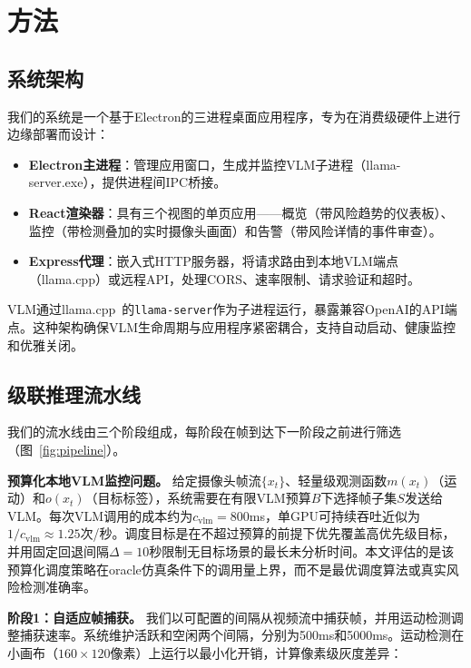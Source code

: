 \documentclass[a4paper,10pt]{ctexart}
\begin{document}
\section{方法}

\subsection{系统架构}

我们的系统是一个基于Electron的三进程桌面应用程序，专为在消费级硬件上进行边缘部署而设计：

\begin{itemize}
\item \textbf{Electron主进程}：管理应用窗口，生成并监控VLM子进程（llama-server.exe），提供进程间IPC桥接。
\item \textbf{React渲染器}：具有三个视图的单页应用——概览（带风险趋势的仪表板）、监控（带检测叠加的实时摄像头画面）和告警（带风险详情的事件审查）。
\item \textbf{Express代理}：嵌入式HTTP服务器，将请求路由到本地VLM端点（llama.cpp）或远程API，处理CORS、速率限制、请求验证和超时。
\end{itemize}

VLM通过llama.cpp~\cite{llamacpp}的\texttt{llama-server}作为子进程运行，暴露兼容OpenAI的API端点。这种架构确保VLM生命周期与应用程序紧密耦合，支持自动启动、健康监控和优雅关闭。

\subsection{级联推理流水线}

我们的流水线由三个阶段组成，每阶段在帧到达下一阶段之前进行筛选（图~\ref{fig:pipeline}）。

\textbf{预算化本地VLM监控问题。}
给定摄像头帧流$\{x_t\}$、轻量级观测函数$m(x_t)$（运动）和$o(x_t)$（目标标签），系统需要在有限VLM预算$B$下选择帧子集$S$发送给VLM。每次VLM调用的成本约为$c_{\mathrm{vlm}}=800$ms，单GPU可持续吞吐近似为$1/c_{\mathrm{vlm}}\approx1.25$次/秒。调度目标是在不超过预算的前提下优先覆盖高优先级目标，并用固定回退间隔$\Delta=10$秒限制无目标场景的最长未分析时间。本文评估的是该预算化调度策略在oracle仿真条件下的调用量上界，而不是最优调度算法或真实风险检测准确率。

\textbf{阶段1：自适应帧捕获。}
我们以可配置的间隔从视频流中捕获帧，并用运动检测调整捕获速率。系统维护活跃和空闲两个间隔，分别为500ms和5000ms。运动检测在小画布（$160 \times 120$像素）上运行以最小化开销，计算像素级灰度差异：
\end{document}

